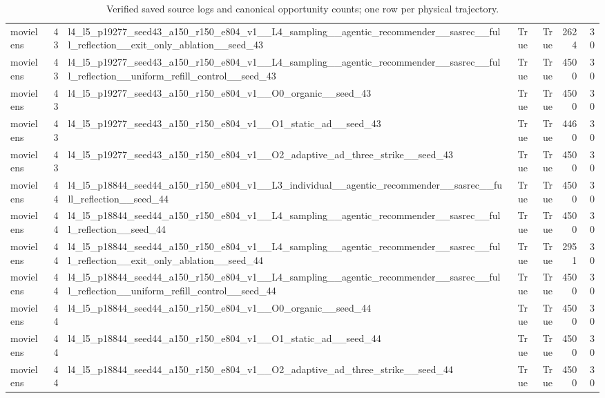 \begin{table}[htbp!]
\begin{tabular}{lrlrrrr}
movielens & 43 & l4\_l5\_p19277\_seed43\_a150\_r150\_e804\_v1\_\_L4\_sampling\_\_agentic\_recommender\_\_sasrec\_\_full\_reflection\_\_exit\_only\_ablation\_\_seed\_43 & True & True & 2624 & 30 \\
movielens & 43 & l4\_l5\_p19277\_seed43\_a150\_r150\_e804\_v1\_\_L4\_sampling\_\_agentic\_recommender\_\_sasrec\_\_full\_reflection\_\_uniform\_refill\_control\_\_seed\_43 & True & True & 4500 & 30 \\
movielens & 43 & l4\_l5\_p19277\_seed43\_a150\_r150\_e804\_v1\_\_O0\_organic\_\_seed\_43 & True & True & 4500 & 30 \\
movielens & 43 & l4\_l5\_p19277\_seed43\_a150\_r150\_e804\_v1\_\_O1\_static\_ad\_\_seed\_43 & True & True & 4460 & 30 \\
movielens & 43 & l4\_l5\_p19277\_seed43\_a150\_r150\_e804\_v1\_\_O2\_adaptive\_ad\_three\_strike\_\_seed\_43 & True & True & 4500 & 30 \\
movielens & 44 & l4\_l5\_p18844\_seed44\_a150\_r150\_e804\_v1\_\_L3\_individual\_\_agentic\_recommender\_\_sasrec\_\_full\_reflection\_\_seed\_44 & True & True & 4500 & 30 \\
movielens & 44 & l4\_l5\_p18844\_seed44\_a150\_r150\_e804\_v1\_\_L4\_sampling\_\_agentic\_recommender\_\_sasrec\_\_full\_reflection\_\_seed\_44 & True & True & 4500 & 30 \\
movielens & 44 & l4\_l5\_p18844\_seed44\_a150\_r150\_e804\_v1\_\_L4\_sampling\_\_agentic\_recommender\_\_sasrec\_\_full\_reflection\_\_exit\_only\_ablation\_\_seed\_44 & True & True & 2951 & 30 \\
movielens & 44 & l4\_l5\_p18844\_seed44\_a150\_r150\_e804\_v1\_\_L4\_sampling\_\_agentic\_recommender\_\_sasrec\_\_full\_reflection\_\_uniform\_refill\_control\_\_seed\_44 & True & True & 4500 & 30 \\
movielens & 44 & l4\_l5\_p18844\_seed44\_a150\_r150\_e804\_v1\_\_O0\_organic\_\_seed\_44 & True & True & 4500 & 30 \\
movielens & 44 & l4\_l5\_p18844\_seed44\_a150\_r150\_e804\_v1\_\_O1\_static\_ad\_\_seed\_44 & True & True & 4500 & 30 \\
movielens & 44 & l4\_l5\_p18844\_seed44\_a150\_r150\_e804\_v1\_\_O2\_adaptive\_ad\_three\_strike\_\_seed\_44 & True & True & 4500 & 30 \\
\hline
\end{tabular}
\caption{Verified saved source logs and canonical opportunity counts; one row per physical trajectory.}
\label{chap:results:tab:analysis_verified_sources}
\end{table}
